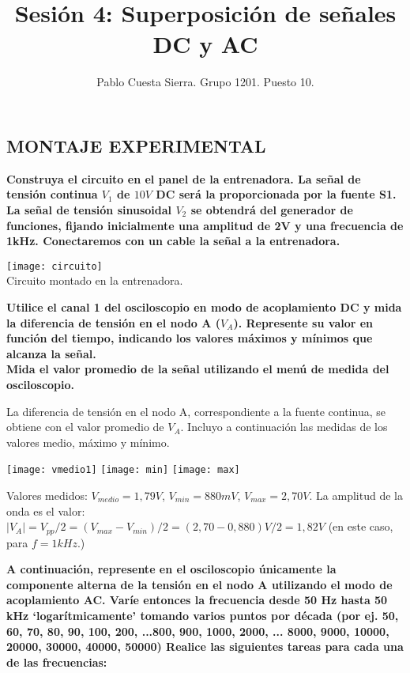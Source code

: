 \documentclass{article}
\title{Sesión 4: Superposición de señales DC y AC}
\date{}
\author{Pablo Cuesta Sierra. Grupo 1201. Puesto 10.}
\begin{document}
\maketitle
\begin{center}
\section*{MONTAJE EXPERIMENTAL}
\end{center}
\textbf{Construya el circuito en el panel de la entrenadora. La señal de tensión continua $V_1$ de $10V$ DC será la proporcionada por la fuente S1. La señal de tensión sinusoidal $V_2$ se obtendrá del generador de funciones, fijando inicialmente una amplitud de 2V y una frecuencia de 1kHz. Conectaremos con un cable la señal a la entrenadora.}
\bigskip

\begin{center}
\texttt{[image: circuito]}\\
Circuito montado en la entrenadora.
\end{center}

\textbf{Utilice el canal 1 del osciloscopio en modo de acoplamiento DC y mida la diferencia de tensión en  el  nodo A ($V_A$). Represente su  valor  en  función  del  tiempo, indicando  los  valores máximos y mínimos que alcanza la señal.\\
Mida el valor promedio de la señal utilizando el menú de medida del osciloscopio.}

La diferencia de tensión en el nodo A, correspondiente a la fuente continua, se obtiene con el valor promedio de $V_A$. Incluyo a continuación las medidas de los valores medio, máximo y mínimo. 

\begin{center}
\texttt{[image: vmedio1]}
\texttt{[image: min]}
\texttt{[image: max]}
\end{center}

Valores medidos: $V_{medio}=1,79V$, $V_{min}=880mV$, $V_{max}=2,70V$. La amplitud de la onda es el valor: $|V_A|=V_{pp}/2=(V_{max}-V_{min})/2=(2,70-0,880)V/2=1,82V$ (en este caso, para $f=1kHz$.)

\bigskip

\textbf{A  continuación, represente en  el  osciloscopio únicamente  la  componente  alterna de  la tensión  en  el  nodo  A utilizando  el  modo  de  acoplamiento  AC. Varíe entonces la  frecuencia desde 50 Hz hasta 50 kHz ‘logarítmicamente’ tomando varios puntos por década (por ej. 50, 60, 70, 80, 90, 100, 200, ...800, 900, 1000, 2000, ... 8000, 9000, 10000, 20000, 30000, 40000, 50000) Realice las siguientes tareas para cada una de las frecuencias: }
\end{document}
